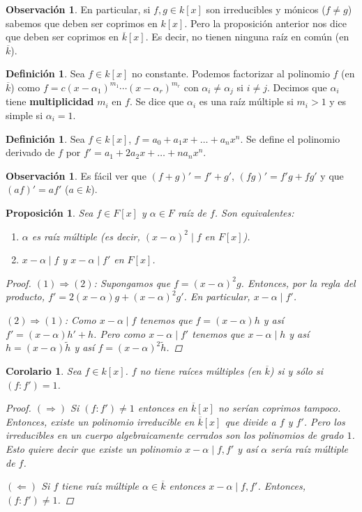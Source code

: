 \documentclass[12pt]{book}
\newtheorem{prop}[teo]{Proposición}
\newtheorem{cor}[teo]{Corolario}
\theoremstyle{definition}
\newtheorem{obs}[teo]{Observación}
\newtheorem{defn}[teo]{Definición}
\begin{document}
\begin{obs}
En particular, si $f,g\in k[x]$ son irreducibles y mónicos ($f\neq g$) sabemos que deben ser coprimos en $k[x]$. Pero la proposición anterior nos dice que deben ser coprimos en $\overline{k}[x]$. Es decir, no tienen ninguna raíz en común (en $\overline{k}$).
\end{obs}

\begin{defn}
Sea $f\in k[x]$ no constante. Podemos factorizar al polinomio $f$ (en $\overline{k}$) como $f=c(x-\alpha_1)^{m_1}\cdots (x-\alpha_r)^{m_r}$ con $\alpha_i\neq \alpha_j$ si $i\neq j$. Decimos que $\alpha_i$ tiene \textbf{multiplicidad} $m_i$ en $f$. Se dice que $\alpha_i$ es una raíz múltiple si $m_i> 1$ y es simple si $\alpha_i=1$.
\end{defn}

\begin{defn}
Sea $f\in k[x]$, $f=a_0 + a_1 x + \ldots + a_n x^n$. Se define el polinomio derivado de $f$ por $f'=a_1 + 2a_2 x + \ldots + na_nx^n$.
\end{defn}

\begin{obs}
Es fácil ver que $(f+g)' = f' + g'$, $(fg)' = f'g + fg'$ y que $(af)' = af'$ ($a\in k$).
\end{obs}

\begin{prop}
Sea $f\in F[x]$ y $\alpha\in F$ raíz de $f$. Son equivalentes:
\begin{enumerate}
\item $\alpha$ es raíz múltiple (es decir, $(x-\alpha)^2 \mid f$ en $F[x]$).
\item $x-\alpha\mid f$ y $x-\alpha\mid f'$ en $F[x]$.
\end{enumerate}
\begin{proof}
$(1)\Longrightarrow (2)$: Supongamos que $f= (x-\alpha)^2 g$. Entonces, por la regla del producto, $f' = 2(x-\alpha)g + (x-\alpha)^2 g'$. En particular, $x-\alpha\mid f'$.

$(2)\Longrightarrow (1)$: Como $x-\alpha \mid f$ tenemos que $f = (x-\alpha)h$ y así $f' = (x-\alpha)h' + h$. Pero como $x-\alpha\mid f'$ tenemos que $x-\alpha \mid h$ y así $ h = (x-\alpha)\tilde{h}$ y así $f=(x-\alpha)^2 \tilde{h}$.
\end{proof}
\end{prop}

\begin{cor}
Sea $f\in k[x]$. $f$ no tiene raíces múltiples (en $\overline{k}$) si y sólo si $(f:f')=1$.
\begin{proof}
$(\Longrightarrow)$ Si $(f:f')\neq 1$ entonces en $\overline{k}[x]$ no serían coprimos tampoco. Entonces, existe un polinomio irreducible en $\overline{k}[x]$ que divide a $f$ y $f'$. Pero los irreducibles en un cuerpo algebraicamente cerrados son los polinomios de grado $1$. Esto quiere decir que existe un polinomio $x-\alpha \mid f,f'$ y así $\alpha$ sería raíz múltiple de $f$.

$(\Longleftarrow)$ Si $f$ tiene raíz múltiple $\alpha\in\overline{k}$ entonces $x-\alpha \mid f,f'$. Entonces, $(f:f')\neq 1$.
\end{proof}
\end{cor}
\end{document}

